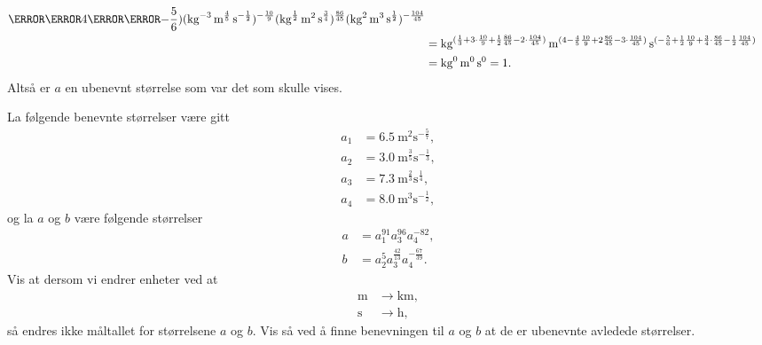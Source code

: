 \documentclass[a4paper,11pt]{article}
\begin{document}
\begin{solution}
\begin{align*}
{              \m\tothe{4}\s\tothe{-\frac{5}{6}}})%
         (\si{\per\kg\cubed%
              \m\tothe{\frac{4}{5}}
              \s\tothe{-\frac{1}{2}}})^{-\frac{10}{9}}%
         (\si{\kg\tothe{\frac{1}{2}}%
              \m\squared%
              \s\tothe{\frac{3}{4}}})^{\frac{86}{45}}%
         (\si{\kg\squared%
              \m\cubed%
              \s\tothe{\frac{1}{2}}})^{-\frac{104}{45}}\\
      &= \si{\kg\tothe{(\frac{1}{3} + 3 \cdot \frac{10}{9} + \frac{1}{2}\frac{86}{45} - 2 \cdot \frac{104}{45})}%
             \m\tothe{(4-\frac{4}{5}\frac{10}{9}+2\frac{86}{45}-3\cdot \frac{104}{45})}%
             \s\tothe{(-\frac{5}{6}+\frac{1}{2}\frac{10}{9} + \frac{3}{4} \cdot \frac{86}{45} - \frac{1}{2}\frac{104}{45})}} \\
      &= \si{\kg\tothe{0}\m\tothe{0}\s\tothe{0}} = 1.
    \end{align*}
    Altså er $a$ en ubenevnt størrelse som var det som skulle vises.
\end{solution}

\newpageNotLF


\begin{problem}[6]
    La følgende benevnte størrelser være gitt
    \begin{align*}
      a_1 &= \SI{6.5}{\m\squared\s\tothe{-\frac{5}{7}}},\\
      a_2 &= \SI{3.0}{\m\tothe{\frac{3}{5}}%
                                \s\tothe{-\frac{1}{3}}},\\
      a_3 &= \SI{7.3}{\m\tothe{\frac{2}{3}}%
                                \s\tothe{\frac{1}{4}}},\\
      a_4 &= \SI{8.0}{\m\cubed\s\tothe{-\frac{1}{2}}},
    \end{align*}
    og la $a$ og $b$ være følgende størrelser
    \begin{align*}
      a &=
      a_1^{91}%
      a_3^{96}%
      a_4^{-82},\\
      b &=
      a_2^{5}%
      a_3^{\frac{42}{13}}%
      a_4^{-\frac{67}{39}}.
    \end{align*}
    Vis at dersom vi endrer enheter ved at
    \begin{align*}
      \si{\m} &\rightarrow \si{\km},\\
      \si{\s} &\rightarrow \si{\hour},
    \end{align*}
    så endres ikke måltallet for størrelsene $a$ og $b$. Vis så ved å finne
    benevningen til $a$ og $b$ at de er ubenevnte avledede størrelser.
\end{problem}
\end{document}
